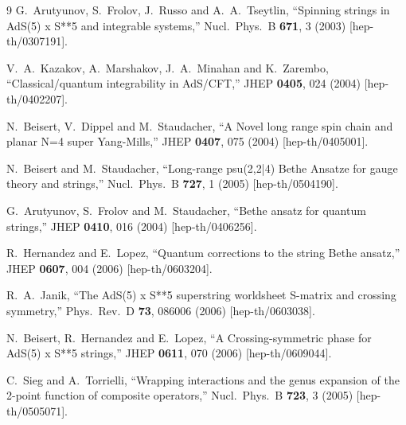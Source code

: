 \documentclass[a4paper,11pt]{article}
\numberwithin{equation}{section}
\begin{document}
\begin{thebibliography} {9}
  G.~Arutyunov, S.~Frolov, J.~Russo and A.~A.~Tseytlin,
  ``Spinning strings in AdS(5) x S**5 and integrable systems,''
  Nucl.\ Phys.\ B {\bf 671}, 3 (2003)
  [hep-th/0307191].

  V.~A.~Kazakov, A.~Marshakov, J.~A.~Minahan and K.~Zarembo,
  ``Classical/quantum integrability in AdS/CFT,''
  JHEP {\bf 0405}, 024 (2004)
  [hep-th/0402207].

  N.~Beisert, V.~Dippel and M.~Staudacher,
  ``A Novel long range spin chain and planar N=4 super Yang-Mills,''
  JHEP {\bf 0407}, 075 (2004)
  [hep-th/0405001].

  N.~Beisert and M.~Staudacher,
  ``Long-range psu(2,2|4) Bethe Ansatze for gauge theory and strings,''
  Nucl.\ Phys.\ B {\bf 727}, 1 (2005)
  [hep-th/0504190].

  G.~Arutyunov, S.~Frolov and M.~Staudacher,
  ``Bethe ansatz for quantum strings,''
  JHEP {\bf 0410}, 016 (2004)
  [hep-th/0406256].

  R.~Hernandez and E.~Lopez,
  ``Quantum corrections to the string Bethe ansatz,''
  JHEP {\bf 0607}, 004 (2006)
  [hep-th/0603204].

  R.~A.~Janik,
  ``The AdS(5) x S**5 superstring worldsheet S-matrix and crossing symmetry,''
  Phys.\ Rev.\ D {\bf 73}, 086006 (2006)
  [hep-th/0603038].

  N.~Beisert, R.~Hernandez and E.~Lopez,
  ``A Crossing-symmetric phase for AdS(5) x S**5 strings,''
  JHEP {\bf 0611}, 070 (2006)
  [hep-th/0609044].

  C.~Sieg and A.~Torrielli,
  ``Wrapping interactions and the genus expansion of the 2-point function of composite operators,''
  Nucl.\ Phys.\ B {\bf 723}, 3 (2005)
  [hep-th/0505071].


\end{thebibliography}
\end{document}

